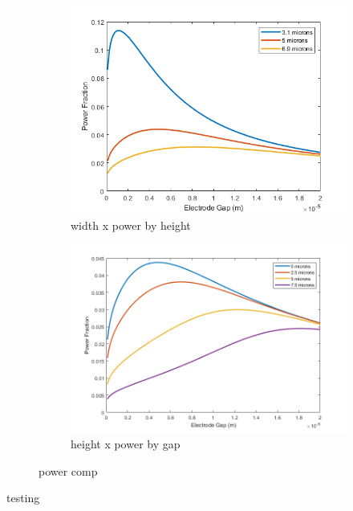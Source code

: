 \begin{figure}[h]
\begin{subfigure}[b]{0.49\textwidth}
        \centering
        \includegraphics[width=\textwidth]{images/analytic_vertical_power_width20.png}
        \caption{width x power by height}
    \end{subfigure}
    \hfill
    \begin{subfigure}[b]{0.49\textwidth}
        \centering
        \includegraphics[width=\textwidth]{images/analytic_horizontal_power_20width.png}
        \caption{height x power by gap}
    \end{subfigure}
    \caption[power comp]{power comp}
    \label{fig:analytic_sensitivity}
\end{figure}

testing